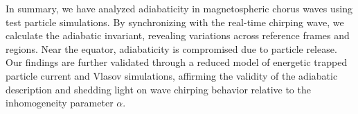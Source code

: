 In summary, 
we have analyzed adiabaticity in magnetospheric chorus waves using test particle simulations. By synchronizing with the real-time chirping wave, we calculate the adiabatic invariant, revealing variations across reference frames and regions. 
Near the equator, adiabaticity is compromised due to particle release. 
Our findings are further validated through a reduced model of energetic trapped particle current and Vlasov simulations, affirming the validity of the adiabatic description and shedding light on wave chirping behavior relative to the inhomogeneity parameter $\alpha$.


